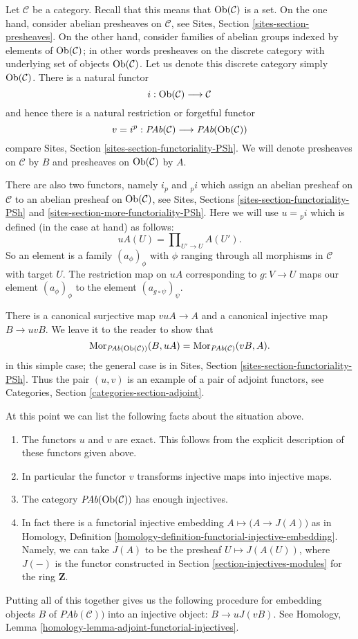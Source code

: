\noindent
Let $\mathcal{C}$ be a category. Recall that this means that
$\mathop{\rm Ob}\nolimits(\mathcal{C})$ is a set. On the one hand, consider abelian
presheaves on $\mathcal{C}$, see
Sites, Section \ref{sites-section-presheaves}.
On the other hand, consider families of abelian groups
indexed by elements of $\mathop{\rm Ob}\nolimits(\mathcal{C})$; in other
words presheaves on the discrete category with underlying set
of objects $\mathop{\rm Ob}\nolimits(\mathcal{C})$. Let us denote this
discrete category simply $\mathop{\rm Ob}\nolimits(\mathcal{C})$.
There is a natural functor
$$
i : \mathop{\rm Ob}\nolimits(\mathcal{C}) \longrightarrow \mathcal{C}
$$
and hence there is a natural restriction or forgetful functor
$$
v = i^p :
\textit{PAb}(\mathcal{C})
\longrightarrow
\textit{PAb}(\mathop{\rm Ob}\nolimits(\mathcal{C}))
$$
compare Sites, Section \ref{sites-section-functoriality-PSh}.
We will denote presheaves
on $\mathcal{C}$ by $B$ and presheaves on
$\mathop{\rm Ob}\nolimits(\mathcal{C})$ by $A$.

\medskip\noindent
There are also two functors, namely $i_p$ and ${}_pi$
which assign an abelian presheaf on $\mathcal{C}$
to an abelian presheaf on $\mathop{\rm Ob}\nolimits(\mathcal{C})$, see
Sites, Sections \ref{sites-section-functoriality-PSh} and
\ref{sites-section-more-functoriality-PSh}.
Here we will use $u = {}_pi$ which is defined (in the case at hand)
as follows:
$$
uA(U) = \prod\nolimits_{U' \to U} A(U').
$$
So an element is a family $(a_\phi)_\phi$ with $\phi$
ranging through all morphisms in $\mathcal{C}$ with target $U$.
The restriction map on $uA$ corresponding to $g : V \to U$
maps our element $(a_\phi)_\phi$ to the element
$(a_{g \circ \psi})_\psi$.

\medskip\noindent
There is a canonical surjective map $vuA \to A$ and a canonical
injective map $B \to uvB$. We leave it to the reader to show that
$$
\mathop{\rm Mor}\nolimits_{\textit{PAb}(\mathop{\rm Ob}\nolimits(\mathcal{C}))}(B, uA)
=
\mathop{\rm Mor}\nolimits_{\textit{PAb}(\mathcal{C})}(vB, A).
$$
in this simple case; the general case is in
Sites, Section \ref{sites-section-functoriality-PSh}.
Thus the pair $(u, v)$ is an example of a pair of adjoint
functors, see
Categories, Section \ref{categories-section-adjoint}.

\medskip\noindent
At this point we can list the following facts
about the situation above.
\begin{enumerate}
\item The functors $u$ and $v$ are exact. This follows from
the explicit description of these functors given above.
\item In particular the functor $v$ transforms injective maps
into injective maps.
\item The category $\textit{PAb}(\mathop{\rm Ob}\nolimits(\mathcal{C}))$
has enough injectives.
\item In fact there is a functorial injective embedding
$A \mapsto \big(A \to J(A)\big)$ as in
Homology, Definition \ref{homology-definition-functorial-injective-embedding}.
Namely, we can take $J(A)$ to be the
presheaf $U\mapsto J(A(U))$, where
$J(-)$ is the functor constructed in
Section \ref{section-injectives-modules} for the ring $\mathbf{Z}$.
\end{enumerate}
Putting all of this together gives us the following procedure
for embedding objects $B$ of $\textit{PAb}(\mathcal{C}))$ into
an injective object: $B \to uJ(vB)$. See
Homology, Lemma \ref{homology-lemma-adjoint-functorial-injectives}.

